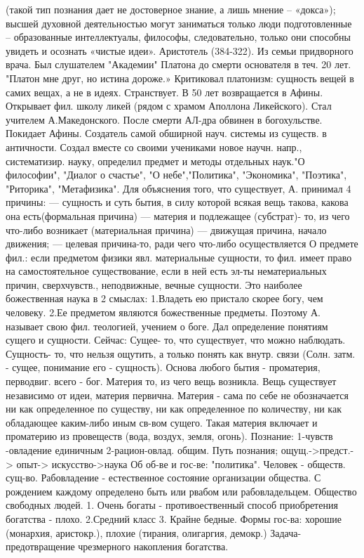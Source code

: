 \documentclass[12pt]{article}
\begin{document}
(такой тип познания дает не достоверное знание, а лишь мнение – «докса»); высшей духовной деятельностью
могут  заниматься  только  люди  подготовленные  –  образованные  интеллектуалы,  философы,  следовательно,
только они способны увидеть и осознать «чистые идеи».
Аристотель (384-322). Из семьи придворного врача. Был слушателем "Академии" Платона до смерти основателя
в теч. 20 лет. "Платон мне друг, но истина дороже.» Критиковал платонизм: сущность вещей в самих вещах, а не
в идеях. Странствует. В 50 лет возвращается в Афины. Открывает фил. школу ликей (рядом с храмом Аполлона
Ликейского). Стал учителем А.Македонского. После смерти АЛ-дра обвинен в богохульстве. Покидает Афины.
Создатель самой обширной науч. системы из существ. в античности. Создал вместе со своими учениками новое
научн. напр., систематизир. науку, определил предмет и методы отдельных наук."О философии", "Диалог о
счастье", "О небе","Политика", "Экономика", "Поэтика", "Риторика", "Метафизика". 
Для объяснения того, что существует, А. принимал 4 причины:
— сущность и суть бытия, в силу которой всякая вещь такова, какова она есть(формальная причина)
— материя и подлежащее (субстрат)- то, из чего что-либо возникает (материальная причина)
— движущая причина, начало движения;
— целевая причина-то, ради чего что-либо осуществляется
О предмете фил.: если предметом физики явл. материальные сущности, то фил. имеет право на самостоятельное
существование, если в ней есть эл-ты нематериальных причин, сверхчувств., неподвижные, вечные сущности. 
Это наиболее божественная наука в 2 смыслах: 
1.Владеть ею пристало скорее богу, чем человеку. 
2.Ее предметом являются божественные предметы. 
Поэтому А. называет свою фил. теологией, учением о боге. Дал определение понятиям сущего и сущности.
Сейчас: Сущее- то, что существует, что можно наблюдать. Сущность- то, что нельзя ощутить, а только понять
как  внутр.  связи  (Солн.  затм.  -  сущее,  понимание  его  -  сущность).  Основа  любого  бытия  -  проматерия,
перводвиг. всего - бог. Материя то, из чего вещь возникла. Вещь существует независимо от идеи, материя
первична. Материя - сама по себе не обозначается ни как определенное по существу, ни как определенное по
количеству, ни как обладающее каким-либо иным св-вом сущего. Такая материя включает и проматерию из
провеществ (вода, воздух, земля, огонь).
Познание: 1-чувств -овладение единичным 2-рацион-овлад. общим. 
Путь познания; ощущ.->предст.-> опыт-> искусство->наука
Об об-ве и гос-ве: "политика". Человек - обществ. сущ-во. Рабовладение - естественное состояние организации
общества. С рождением каждому определено быть или рвабом или рабовладельцем.
Общество свободных людей. 
1. Очень богаты - противоественный способ приобретения богатства - плохо. 
2.Средний класс 
3. Крайне бедные. 
Формы гос-ва: хорошие (монархия, аристокр.), плохие (тирания, олигаргия, демокр.) Задача- предотвращение
чрезмерного накопления богатства.
\end{document}
